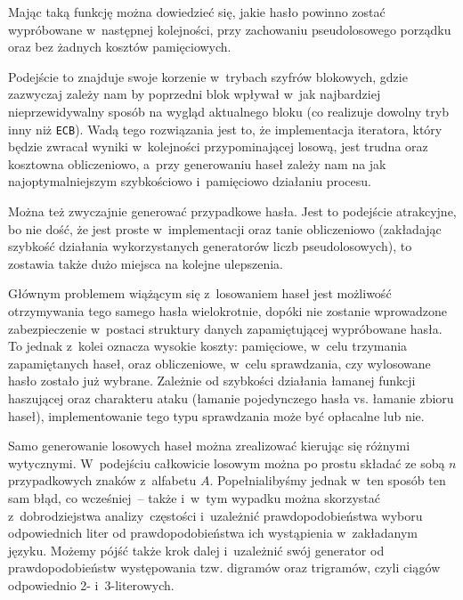\begin{myenumerate}
    Mając taką funkcję można dowiedzieć się, jakie hasło powinno zostać
    wypróbowane w~następnej kolejności, przy zachowaniu pseudolosowego porządku
    oraz bez żadnych kosztów pamięciowych.

    Podejście to znajduje swoje korzenie w~trybach szyfrów blokowych, gdzie
    zazwyczaj zależy nam by poprzedni blok wpływał w~jak najbardziej
    nieprzewidywalny sposób na wygląd aktualnego bloku (co realizuje dowolny
    tryb inny niż \texttt{ECB}). Wadą tego rozwiązania jest to, że
    implementacja iteratora, który będzie zwracał wyniki w~kolejności
    przypominającej losową, jest trudna oraz kosztowna obliczeniowo, a~przy
    generowaniu haseł zależy nam na jak najoptymalniejszym szybkościowo
    i~pamięciowo działaniu procesu.

    \item Można też zwyczajnie generować przypadkowe hasła. Jest to podejście
    atrakcyjne, bo nie dość, że jest proste w~implementacji oraz tanie
    obliczeniowo (zakładając szybkość działania wykorzystanych generatorów
    liczb pseudolosowych), to zostawia także dużo miejsca na kolejne
    ulepszenia.

    Głównym problemem wiążącym się z~losowaniem haseł jest możliwość
    otrzymywania tego samego hasła wielokrotnie, dopóki nie zostanie
    wprowadzone zabezpieczenie w~postaci struktury danych zapamiętującej
    wypróbowane hasła. To jednak z~kolei oznacza wysokie koszty: pamięciowe,
    w~celu trzymania zapamiętanych haseł, oraz obliczeniowe, w~celu
    sprawdzania, czy wylosowane hasło zostało już wybrane. Zależnie od
    szybkości działania łamanej funkcji haszującej oraz charakteru ataku
    (łamanie pojedynczego hasła vs. łamanie zbioru haseł), implementowanie tego
    typu sprawdzania może być opłacalne lub nie.

    Samo generowanie losowych haseł można zrealizować kierując się różnymi
    wytycznymi. W~podejściu całkowicie losowym można po prostu składać ze sobą
    $n$ przypadkowych znaków z~alfabetu $A$. Popełnialibyśmy jednak w~ten
    sposób ten sam błąd, co wcześniej~-- także i~w~tym wypadku można skorzystać
    z~dobrodziejstwa analizy~częstości i~uzależnić prawdopodobieństwa
    wyboru odpowiednich liter od prawdopodobieństwa ich wystąpienia
    w~zakładanym języku. Możemy pójść także krok dalej i~uzależnić swój
    generator od prawdopodobieństw występowania tzw. digramów oraz trigramów,
    czyli ciągów odpowiednio 2- i~3-literowych.


\end{myenumerate}
